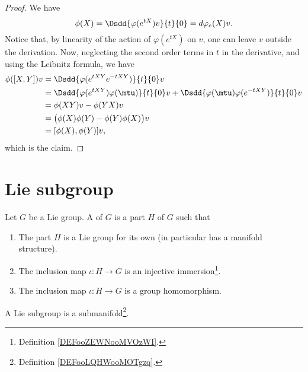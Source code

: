 \begin{proof}
    We have
    \begin{equation}
        \phi(X)=\Dsdd{ \varphi( e^{tX})v }{t}{0}=d\varphi_e(X)v.
    \end{equation}
    Notice that, by linearity of the action of $\varphi( e^{tX})$ on $v$, one can leave $v$ outside the derivation. Now, neglecting the second order terms in $t$ in the derivative, and using the Leibnitz formula, we have
    \begin{equation}
        \begin{aligned}[]
            \phi([X,Y])v    &=  \Dsdd{ \varphi( e^{tXY} e^{-tXY}) }{t}{0}v\\
                    &=  \Dsdd{ \varphi( e^{tXY})\varphi(\mtu) }{t}{0}v+\Dsdd{ \varphi(\mtu)\varphi( e^{-tXY}) }{t}{0}v\\
                    &=  \phi(XY)v-\phi(YX)v\\
                    &=  \big( \phi(X)\phi(Y)-\phi(Y)\phi(X) \big)v\\
                    &=  [\phi(X),\phi(Y)]v,
        \end{aligned}
    \end{equation}
    which is the claim.
\end{proof}

\section{Lie subgroup}

\begin{definition}        \label{DEFooGCHDooHUMSju}
    Let \( G\) be a Lie group. A  of \( G\) is a part \( H\) of \( G\) such that
    \begin{enumerate}
        \item
            The part \( H\) is a Lie group for its own (in particular has a manifold structure).
        \item
            The inclusion map \( \iota\colon H\to G\) is an injective immersion\footnote{Definition \ref{DEFooZEWNooMVOzWI}.}.
        \item
            The inclusion map \( \iota\colon H\to G\) is a group homomorphism.
    \end{enumerate}
\end{definition}

\begin{proposition}     \label{PROPooFXZJooCOFXZX}
    A Lie subgroup is a submanifold\footnote{Definition \ref{DEFooLQHWooMOTgzq}.}. 
\end{proposition}

